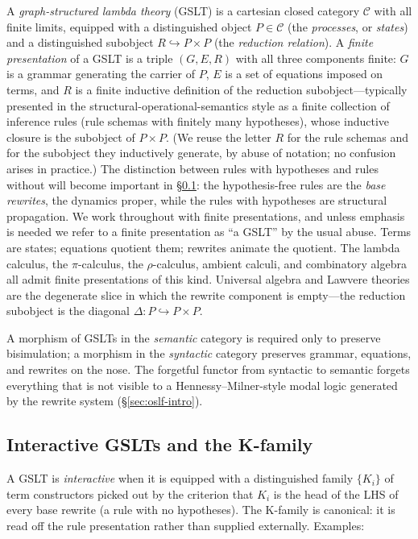 \documentclass[11pt]{article}
\theoremstyle{plain}
\theoremstyle{definition}
\theoremstyle{remark}
\begin{document}
A \emph{graph-structured lambda theory} (GSLT) is a cartesian closed category $\mathcal{C}$ with all finite limits, equipped with a distinguished object $P \in \mathcal{C}$ (the \emph{processes}, or \emph{states}) and a distinguished subobject $R \hookrightarrow P \times P$ (the \emph{reduction relation}). A \emph{finite presentation} of a GSLT is a triple $(G, E, R)$ with all three components finite: $G$ is a grammar generating the carrier of $P$, $E$ is a set of equations imposed on terms, and $R$ is a finite inductive definition of the reduction subobject---typically presented in the structural-operational-semantics style as a finite collection of inference rules (rule schemas with finitely many hypotheses), whose inductive closure is the subobject of $P \times P$. (We reuse the letter $R$ for the rule schemas and for the subobject they inductively generate, by abuse of notation; no confusion arises in practice.) The distinction between rules with hypotheses and rules without will become important in \S\ref{sec:interactive}: the hypothesis-free rules are the \emph{base rewrites}, the dynamics proper, while the rules with hypotheses are structural propagation. We work throughout with finite presentations, and unless emphasis is needed we refer to a finite presentation as ``a GSLT'' by the usual abuse. Terms are states; equations quotient them; rewrites animate the quotient. The lambda calculus, the $\pi$-calculus, the $\rho$-calculus, ambient calculi, and combinatory algebra all admit finite presentations of this kind. Universal algebra and Lawvere theories are the degenerate slice in which the rewrite component is empty---the reduction subobject is the diagonal $\Delta : P \hookrightarrow P \times P$.

A morphism of GSLTs in the \emph{semantic} category is required only to preserve bisimulation; a morphism in the \emph{syntactic} category preserves grammar, equations, and rewrites on the nose. The forgetful functor from syntactic to semantic forgets everything that is not visible to a Hennessy--Milner-style modal logic generated by the rewrite system (\S\ref{sec:oslf-intro}).

\subsection{Interactive GSLTs and the K-family}\label{sec:interactive}

A GSLT is \emph{interactive} when it is equipped with a distinguished family $\{K_i\}$ of term constructors picked out by the criterion that $K_i$ is the head of the LHS of every base rewrite (a rule with no hypotheses). The K-family is canonical: it is read off the rule presentation rather than supplied externally. Examples:
\end{document}
